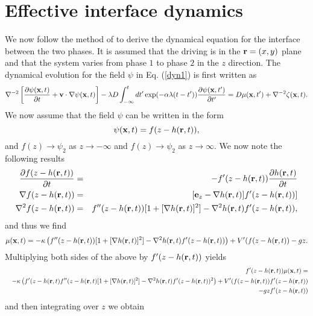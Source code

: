 \section{Effective interface dynamics}
We now follow the method of \cite{bray2001,bray2002} to derive the dynamical equation  for the interface between the two phases. It is assumed that the driving is in the ${\bf r}=(x,y)$ plane and that the system varies from phase $1$ to phase $2$ in the $z$ direction. The dynamical evolution for the field $\psi$ in Eq. (\ref{dyn1}) is first written as
\begin{equation}
\nabla^{-2}\left[\frac{\partial \psi({\bf x},t)}{\partial t}+{\bf v}\cdot\nabla\psi({\bf x}, t)\right] -\lambda D\int_{-\infty}^t dt'
\exp(-\alpha\lambda(t-t')) \frac{\partial \psi({\bf x},t')}{\partial t'}=D  \mu({\bf x},t') + \nabla^{-2} \zeta({\bf x},t).\label{eqpsi}
\end{equation}
We now assume that the field $\psi$ can be written in the form
\begin{equation}
\psi({\bf x},t) = f(z-h({\bf r},t)),
\end{equation}
and $f(z)\to \psi_2$ as $z\to -\infty$ and $f(z)\to \psi_2$ as  $z\to \infty$.
We now note the following results
\begin{eqnarray}
\frac{\partial f(z-h({\bf r},t))}{\partial t} &=& -f'(z-h({\bf r},t))\frac{\partial h({\bf r},t)}{\partial t}\\
\nabla f(z-h({\bf r},t) )&=& [{\bf e}_z -\nabla h({\bf r},t)]f'(z-h({\bf r},t))]\\
\nabla^2 f(z-h({\bf r},t)) &=& f''(z-h({\bf r},t))[1 + [\nabla h({\bf r},t)]^2] -\nabla^2 h({\bf r},t)f'(z-h({\bf r},t)),
\end{eqnarray}
and thus we find
\begin{equation}
\mu({\bf x},t)= -\kappa\left(f''(z-h({\bf r},t))[1 + [\nabla h({\bf r},t)]^2] -\nabla^2 h({\bf r},t)f'(z-h({\bf r},t))\right) + V'(f(z-h({\bf r},t)) - gz .
\end{equation}
Multiplying both sides of the above by $f'(z-h({\bf r},t))$ yields
\begin{eqnarray}
&&f'(z-h({\bf r},t))\mu({\bf x},t)=\nonumber \\
 &&-\kappa\left(f'(z-h({\bf r},t)f''(z-h({\bf r},t)[1 + [\nabla h({\bf r},t)]^2] -\nabla^2 h({\bf r},t)f'(z-h({\bf r},t))^2\right) + V'(f(z-h({\bf r},t))f'(z-h({\bf r},t))\nonumber \\
 &&- gz f'(z-h({\bf r},t)) \nonumber
\end{eqnarray}
and then integrating over $z$ we obtain

